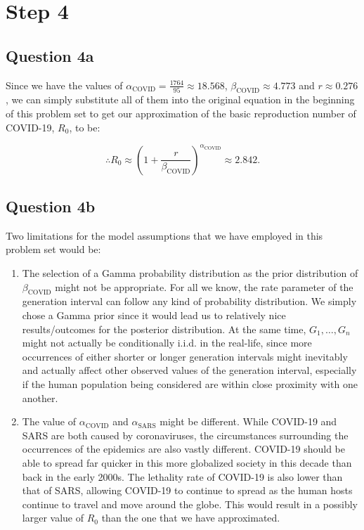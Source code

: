 \documentclass[11pt,fancychapters]{article}
\begin{document}
\section*{Step 4}

\subsection*{Question 4a}

Since we have the values of $\alpha_\text{COVID} = \frac{1764}{95} \approx 18.568$, $\beta_\text{COVID} \approx 4.773$ and $r \approx 0.276$, we can simply substitute all of them into the original equation in the beginning of this problem set to get our approximation of the basic reproduction number of COVID-19, $R_0$, to be:

\begin{tcolorbox}
\begin{equation}\label{eqn4a1}
    \therefore R_0 \approx \left( 1 + \frac{r}{\beta_\text{COVID}} \right)^{\alpha_\text{COVID}} \approx 2.842.
\end{equation}
\end{tcolorbox}

\subsection*{Question 4b}

Two limitations for the model assumptions that we have employed in this problem set would be:

\begin{enumerate}
    \item The selection of a Gamma probability distribution as the prior distribution of $\beta_\text{COVID}$ might not be appropriate. For all we know, the rate parameter of the generation interval can follow any kind of probability distribution. We simply chose a Gamma prior since it would lead us to relatively nice results/outcomes for the posterior distribution. At the same time, $G_1, \dots, G_n$ might not actually be conditionally i.i.d. in the real-life, since more occurrences of either shorter or longer generation intervals might inevitably and actually affect other observed values of the generation interval, especially if the human population being considered are within close proximity with one another.
    \item The value of $\alpha_\text{COVID}$ and $\alpha_\text{SARS}$ might be different. While COVID-19 and SARS are both caused by coronaviruses, the circumstances surrounding the occurrences of the epidemics are also vastly different. COVID-19 should be able to spread far quicker in this more globalized society in this decade than back in the early 2000s. The lethality rate of COVID-19 is also lower than that of SARS, allowing COVID-19 to continue to spread as the human hosts continue to travel and move around the globe. This would result in a possibly larger value of $R_0$ than the one that we have approximated.
\end{enumerate}
\end{document}
